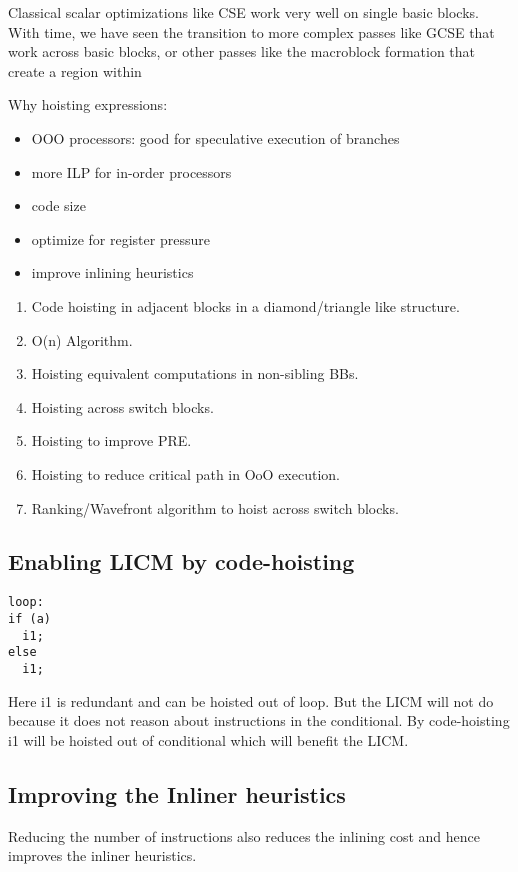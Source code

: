 \documentclass{sig-alternate}
\begin{document}
Classical scalar optimizations like CSE \cite{dragonbook} work very well on
single basic blocks.  With time, we have seen the transition to more complex
passes like GCSE that work across basic blocks, or other passes like the
macroblock formation that create a region within


Why hoisting expressions:
\begin{itemize}
\item OOO processors: good for speculative execution of branches
\item more ILP for in-order processors
\item code size
\item optimize for register pressure
\item improve inlining heuristics
\end{itemize}

\begin{enumerate}
\item Code hoisting in adjacent blocks in a diamond/triangle like structure.
\item O(n) Algorithm.
\item Hoisting equivalent computations in non-sibling BBs.
\item Hoisting across switch blocks.
\item Hoisting to improve PRE.
\item Hoisting to reduce critical path in OoO execution.
\item Ranking/Wavefront algorithm to hoist across switch blocks.
\end{enumerate}

\subsection{Enabling LICM by code-hoisting}

\begin{verbatim}
loop:
if (a)
  i1;
else
  i1;
\end{verbatim}

Here i1 is redundant and can be hoisted out of loop. But the LICM will
not do because it does not reason about instructions in the
conditional.  By code-hoisting i1 will be hoisted out of conditional
which will benefit the LICM.

\subsection{Improving the Inliner heuristics}
Reducing the number of instructions also reduces the inlining cost and
hence improves the inliner heuristics.
\end{document}
